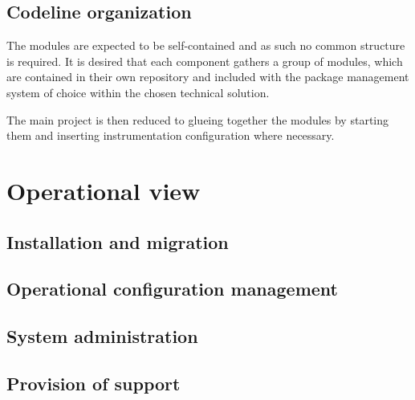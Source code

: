 \subsection{Codeline organization}
\label{sec:codel-organ}
The modules are expected to be self-contained and as such no common structure
is required. It is desired that each component gathers a group of modules,
which are contained in their own repository and included with the package
management system of choice within the chosen technical solution.

The main project is then reduced to glueing together the modules by starting
them and inserting instrumentation configuration where necessary. 

\section{Operational view}
\label{sec:operational-view}

\subsection{Installation and migration}
\label{sec:inst-migr}


\subsection{Operational configuration management}
\label{sec:oper-conf-manag}


\subsection{System administration}
\label{sec:syst-admin}


\subsection{Provision of support}
\label{sec:provision-support}

